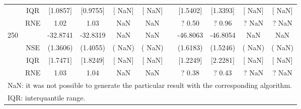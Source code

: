 {{\begin{longtable}{ccccccccccc}
 & IQR & $[$1.0857$]$ & $[$0.9755$]$ & $[$   NaN$]$ & $[$   NaN$]$ & & $[$1.5402$]$ & $[$1.3393$]$  &$[$   NaN$]$ & $[$   NaN$]$  \\  
  & RNE &   1.02 &   1.03 &    NaN &    NaN &  &?   0.50 & ?   0.96 &  ?    NaN & ?    NaN   \\ [1ex] 
250 & & -32.8741 & -32.8319 &    NaN &    NaN & & -46.8063 & -46.8054 &    NaN &    NaN  \\ 
  & NSE & (1.3606) & (1.4055) & (   NaN) & (   NaN) & & (1.6183) & (1.5246) & (   NaN) & (   NaN)   \\ 
 & IQR & $[$1.7471$]$ & $[$1.8249$]$ & $[$   NaN$]$ & $[$   NaN$]$ & & $[$1.2249$]$ & $[$2.2281$]$  &$[$   NaN$]$ & $[$   NaN$]$  \\  
  & RNE &   1.03 &   1.04 &    NaN &    NaN &  &?   0.38 & ?   0.43 &  ?    NaN & ?    NaN   \\ [1ex] 
\hline 
  \multicolumn{11}{l}{\footnotesize{NaN: it was not possible to generate the particular result with the corresponding algorithm.}} \\ 
  \multicolumn{11}{l}{\footnotesize{IQR: interquantile range.}} \\ 
\end{longtable} 
} 
} 
